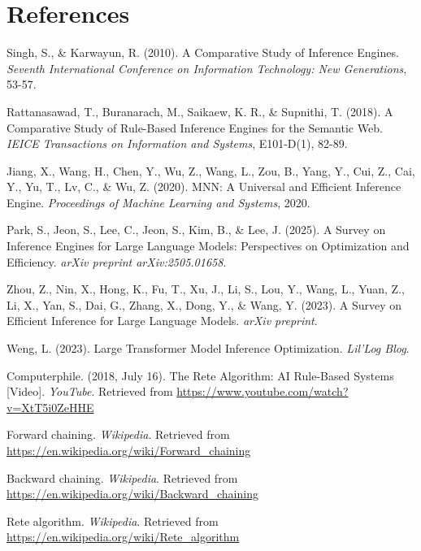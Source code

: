 \documentclass[12pt,a4paper]{article}
\begin{document}
\section{References}
\begin{thebibliography}{99}
\vspace{-1.0cm}
Singh, S., \& Karwayun, R. (2010). A Comparative Study of Inference Engines. \textit{Seventh International Conference on Information Technology: New Generations}, 53-57.

Rattanasawad, T., Buranarach, M., Saikaew, K. R., \& Supnithi, T. (2018). A Comparative Study of Rule-Based Inference Engines for the Semantic Web. \textit{IEICE Transactions on Information and Systems}, E101-D(1), 82-89.

Jiang, X., Wang, H., Chen, Y., Wu, Z., Wang, L., Zou, B., Yang, Y., Cui, Z., Cai, Y., Yu, T., Lv, C., \& Wu, Z. (2020). MNN: A Universal and Efficient Inference Engine. \textit{Proceedings of Machine Learning and Systems}, 2020.

Park, S., Jeon, S., Lee, C., Jeon, S., Kim, B., \& Lee, J. (2025). A Survey on Inference Engines for Large Language Models: Perspectives on Optimization and Efficiency. \textit{arXiv preprint arXiv:2505.01658}.

Zhou, Z., Nin, X., Hong, K., Fu, T., Xu, J., Li, S., Lou, Y., Wang, L., Yuan, Z., Li, X., Yan, S., Dai, G., Zhang, X., Dong, Y., \& Wang, Y. (2023). A Survey on Efficient Inference for Large Language Models. \textit{arXiv preprint}.

Weng, L. (2023). Large Transformer Model Inference Optimization. \textit{Lil'Log Blog}.

Computerphile. (2018, July 16). The Rete Algorithm: AI Rule-Based Systems [Video]. \textit{YouTube}. Retrieved from \url{https://www.youtube.com/watch?v=XtT5i0ZeHHE}

Forward chaining. \textit{Wikipedia}. Retrieved from \url{https://en.wikipedia.org/wiki/Forward_chaining}

Backward chaining. \textit{Wikipedia}. Retrieved from \url{https://en.wikipedia.org/wiki/Backward_chaining}

Rete algorithm. \textit{Wikipedia}. Retrieved from \url{https://en.wikipedia.org/wiki/Rete_algorithm}


\end{thebibliography}
\end{document}
